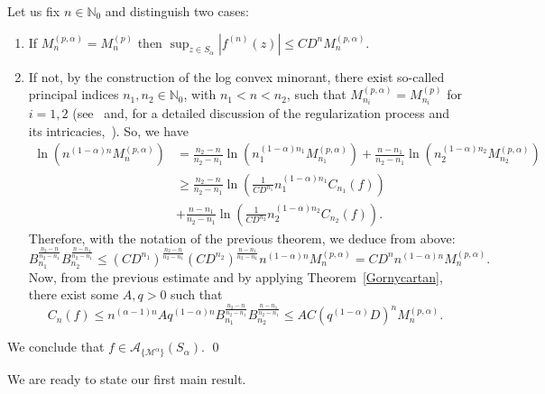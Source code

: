\documentclass[11pt,a4paper]{article}
\theoremstyle{plain}
\theoremstyle{definition}
\newcommand{\NN}{\mathbb{N}}
\newcommand{\M}{\mathbb{M}}
\newcommand{\G}{\mathbb{G}}
\begin{document}
Let us fix $n\in\NN_{0}$ and distinguish two cases:
\begin{enumerate}
	\item [i)] If $M_n^{(p,\alpha)}=M_n^{(p)}$ then $\sup_{z\in S_\alpha}|f^{(n)}(z)|\leq C D^n M_n^{(p,\alpha)}$.
	\item[ii)] If not, by the construction of
the log convex minorant,
there exist so-called principal indices $n_1,n_2\in\NN_0$, with $n_1<n<n_2$, such that $M_{n_i}^{(p,\alpha)}=M_{n_i}^{(p)}$ for $i=1,2$ (see~\cite[Chapitre~I]{mandelbrojtbook} and, for a detailed discussion of the regularization process and its intricacies,~\cite{regularization}). So, we have
	\begin{align*}
		 \ln(n^{(1-\alpha)n}M_n^{(p,\alpha)})&=\frac{n_2-n}{n_2-n_1}\ln(n_1^{(1-\alpha)n_1}M_{n_1}^{(p,\alpha)}) +\frac{n-n_1}{n_2-n_1}\ln(n_2^{(1-\alpha)n_2}M_{n_2}^{(p,\alpha)})\\
		&\geq \frac{n_2-n}{n_2-n_1}\ln(\frac{1}{CD^{n_1}}n_1^{(1-\alpha)n_1}C_{n_1}(f))\\ &+\frac{n-n_1}{n_2-n_1}\ln(\frac{1}{CD^{n_2}}n_2^{(1-\alpha)n_2}C_{n_2}(f)).
	\end{align*}
	Therefore, with the notation of the previous theorem, we deduce from above:
	\begin{equation*}
		 B_{n_1}^{\frac{n_2-n}{n_2-n_1}}B_{n_2}^{\frac{n-n_1}{n_2-n_1}}\leq (CD^{n_1})^{\frac{n_2-n}{n_2-n_1}}(CD^{n_2})^{\frac{n-n_1}{n_2-n_1}}n^{(1-\alpha)n}M_n^{(p,\alpha)} =CD^nn^{(1-\alpha)n}M_n^{(p,\alpha)}.
	\end{equation*}
	Now, from the previous estimate and by applying Theorem~\ref{Gornycartan}, there exist some $A,q>0$ such that
	\begin{equation*}
		C_n(f)\leq n^{(\alpha-1)n}A q^{(1-\alpha)n}B_{n_1}^{\frac{n_2-n}{n_2-n_1}}B_{n_2}^{\frac{n-n_1}{n_2-n_1}}\leq AC (q^{(1-\alpha)}D)^nM_n^{(p,\alpha)}.
	\end{equation*}
\end{enumerate}
We conclude that $f\in \mathcal{A}_{\{\mathcal{M}^\alpha\}}(S_{\alpha})$.
\qed\enddemo

We are ready to state our first main result.
\end{document}
